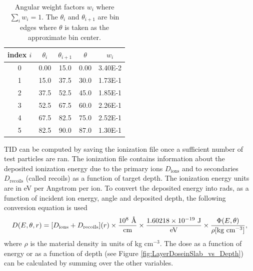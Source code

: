 \documentclass{hitec}
\begin{document}
\begin{table}[h]\centering
	\caption{Angular weight factors $w_i$ where $\sum_i w_i = 1$. The $\theta_i$ and $\theta_{i+1}$ are bin edges where $\theta$ is taken as the approximate bin center.}\label{tab:incidentAngleBins}
	\begin{tabular}{|c | c | c | c | c |}\hline
		index $i$ & $\theta_i$ & $\theta_{i+1}$ & $\theta$ & $w_i$ \\\hline
		0  & 0.00 & 15.0 & 0.00 & 3.40E-2 \\\hline
		1  & 15.0 & 37.5 & 30.0 & 1.73E-1 \\\hline
		2  & 37.5 & 52.5 & 45.0 & 1.85E-1\\\hline
		3  & 52.5 & 67.5 & 60.0 & 2.26E-1 \\\hline
		4  & 67.5 & 82.5 & 75.0 & 2.52E-1\\\hline
    	5  & 82.5 & 90.0 & 87.0 & 1.30E-1\\\hline
	\end{tabular}
\end{table}

TID can be computed by saving the ionization file once a sufficient number of test particles are ran. The ionization file contains information about the deposited ionization energy due to the primary ions $D_{\text{ions}}$ and to secondaries $D_{\text{recoils}}$ (called recoils) as a function of target depth. The ionization energy units are in eV per Angstrom per ion. To convert the deposited energy into rads, as a function of incident ion energy, angle and deposited depth, the following conversion equation is used
\begin{equation}
D(E,\theta,r) = [D_{\text{ions}} + D_{\text{recoils}}](r) \times \frac{10^8 \text{ \si{\angstrom}}}{\text{cm}} \times \frac{1.60218\times 10^{-19} \text{ J}}{\text{eV}} \times \frac{\Phi(E,\theta)}{\rho[\text{kg cm$^{-3}$}]} ,
\end{equation}
where $\rho$ is the material density in units of kg cm$^{-3}$. The dose as a function of energy or as a function of depth (see Figure \ref{fig:LayerDoseinSlab_vs_Depth}) can be calculated by summing over the other variables.
\end{document}
